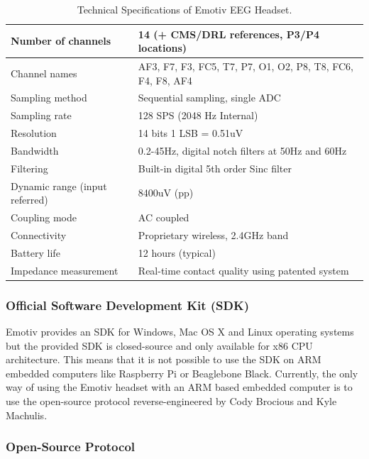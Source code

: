 \documentclass[12pt]{article}
\newcommand\mysubsubsection[1]{\subsubsection{#1}}
\numberwithin{equation}{section}
\numberwithin{figure}{section}
\numberwithin{table}{section}
\begin{document}
\begin{table}
    \footnotesize
    \centering
    \caption{Technical Specifications of Emotiv EEG Headset.}
    \begin{tabular}{ll}
        \hline
        Number of channels & 14 (+ CMS/DRL references, P3/P4 locations) \\ \hline
        Channel names & AF3, F7, F3, FC5, T7, P7, O1, O2, P8, T8, FC6, F4, F8, AF4 \\ \hline
        Sampling method & Sequential sampling, single ADC \\ \hline
        Sampling rate & 128 SPS (2048 Hz Internal) \\ \hline
        Resolution & 14 bits 1 LSB = 0.51uV \\ \hline
        Bandwidth & 0.2-45Hz, digital notch filters at 50Hz and 60Hz \\ \hline
        Filtering & Built-in digital 5th order Sinc filter \\ \hline
        Dynamic range (input referred) & 8400uV (pp) \\ \hline
        Coupling mode & AC coupled \\ \hline
        Connectivity & Proprietary wireless, 2.4GHz band \\ \hline
        Battery life & 12 hours (typical) \\ \hline
        Impedance measurement & Real-time contact quality using patented system \\ \hline
    \end{tabular}
    \label{table:emotiv_eeg_specs}
\end{table}

\mysubsubsection{Official Software Development Kit (SDK)}\label{seq:emotiveeg_sdk}

\par{
Emotiv provides an SDK for Windows, Mac OS X and Linux operating systems but the provided SDK is
closed-source and only available for x86 CPU architecture. This means that it is not possible
to use the SDK on ARM embedded computers like Raspberry Pi or Beaglebone Black.
Currently, the only way of using the Emotiv headset with an ARM based embedded computer is to use the
open-source protocol reverse-engineered by Cody Brocious and Kyle Machulis.
}

\mysubsubsection{Open-Source Protocol}\label{seq:emotiveeg_opensource}
\end{document}
